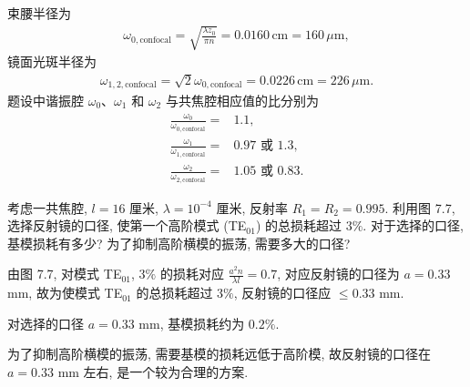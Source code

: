 \documentclass{note}
\begin{document}
\begin{sol}
\begin{itemize}
        束腰半径为
        \begin{align}
            \omega_{0,\text{confocal}}=\sqrt{\frac{\lambda z_0}{\pi n}}=0.0160\,\text{cm}=160\,\mu\text{m},
        \end{align}
        镜面光斑半径为
        \begin{align}
            \omega_{1,2,\text{confocal}}=\sqrt{2}\omega_{0,\text{confocal}}=0.0226\,\text{cm}=226\,\mu\text{m}.
        \end{align}
        题设中谐振腔 $\omega_0$、$\omega_1$ 和 $\omega_2$ 与共焦腔相应值的比分别为
        \begin{align}
            \frac{\omega_0}{\omega_{0,\text{confocal}}}=&1.1,\\
            \frac{\omega_1}{\omega_{1,\text{confocal}}}=&0.97\text{ 或 }1.3,\\
            \frac{\omega_2}{\omega_{2,\text{confocal}}}=&1.05\text{ 或 }0.83.
        \end{align}
    \end{itemize}
\end{sol}

\begin{exe}
    考虑一共焦腔, $l=16$ 厘米, $\lambda=10^{-4}$ 厘米, 反射率 $R_1=R_2=0.995$. 利用图 7.7, 选择反射镜的口径, 使第一个高阶模式 (TE$_{01}$) 的总损耗超过 $3\%$. 对于选择的口径, 基模损耗有多少? 为了抑制高阶横模的振荡, 需要多大的口径?
\end{exe}
\begin{sol}
    由图 7.7, 对模式 TE$_{01}$, $3\%$ 的损耗对应 $\frac{a^2n}{\lambda l}=0.7$, 对应反射镜的口径为 $a=0.33$ mm, 故为使模式 TE$_{01}$ 的总损耗超过 $3\%$, 反射镜的口径应 $\leq 0.33$ mm.

    对选择的口径 $a=0.33$ mm, 基模损耗约为 $0.2\%$.

    为了抑制高阶横模的振荡, 需要基模的损耗远低于高阶模, 故反射镜的口径在 $a=0.33$ mm 左右, 是一个较为合理的方案.
\end{sol}
\end{document}
